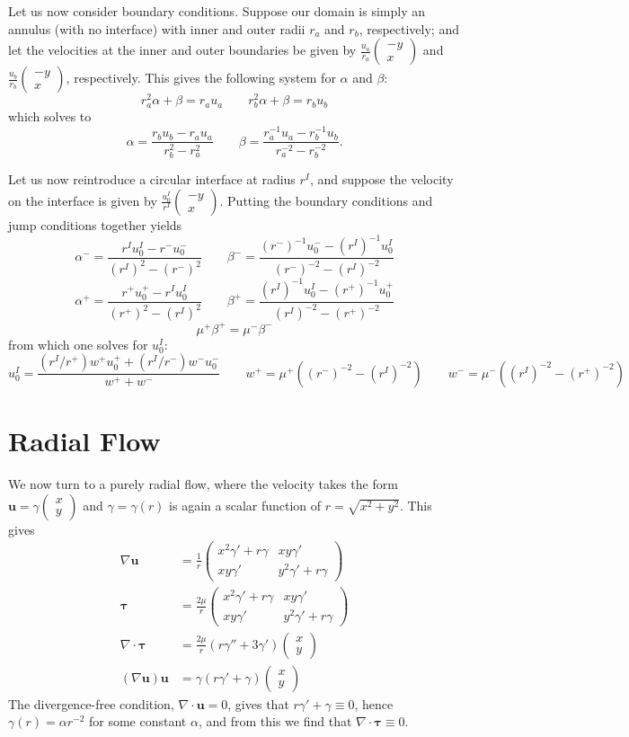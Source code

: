 \documentclass{article}
\newcommand{\q}{\quad\quad}
\newcommand{\uu}{\mathbf{u}}
\renewcommand{\uu}{\mathbf{u}}
\newcommand{\ta}{\pmb{\tau}}
\newcommand{\mx}[1]{\begin{pmatrix} #1 \end{pmatrix}}
\begin{document}
Let us now consider boundary conditions.  Suppose our domain is simply an annulus (with no interface) with inner and outer radii $r_a$ and $r_b$, respectively; and let the velocities at the inner and outer boundaries be given by $\frac{u_a}{r_a} \mx{-y \\ x}$ and $\frac{u_b}{r_b} \mx{-y \\ x}$, respectively.  This gives the following system for $\alpha$ and $\beta$:
$$ r_a^2 \alpha + \beta = r_a u_a \q r_b^2 \alpha + \beta = r_b u_b $$
which solves to
$$ \alpha = \frac{r_b u_b - r_a u_a}{r_b^2 - r_a^2} \q \beta = \frac{r_a^{-1} u_a - r_b^{-1} u_b}{r_a^{-2} - r_b^{-2}}. $$

Let us now reintroduce a circular interface at radius $r^I$, and suppose the velocity on the interface is given by $\frac{u^I_0}{r^I} \mx{-y \\ x}$.  Putting the boundary conditions and jump conditions together yields
$$ \alpha^- = \frac{r^I u^I_0 - r^- u^-_0}{(r^I)^2 - (r^-)^2} \q \beta^- = \frac{(r^-)^{-1} u^-_0 - (r^I)^{-1} u^I_0}{(r^-)^{-2} - (r^I)^{-2}} $$
$$ \alpha^+ = \frac{r^+ u^+_0 - r^I u^I_0}{(r^+)^2 - (r^I)^2} \q \beta^+ = \frac{(r^I)^{-1} u^I_0 - (r^+)^{-1} u^+_0}{(r^I)^{-2} - (r^+)^{-2}} $$
$$ \mu^+ \beta^+ = \mu^- \beta^- $$
from which one solves for $u^I_0$:
$$ u^I_0 = \frac{(r^I/r^+) w^+ u^+_0 + (r^I/r^-) w^- u^-_0}{w^+ + w^-} \q w^+ = \mu^+ \left( (r^-)^{-2} - (r^I)^{-2} \right) \q w^- = \mu^- \left( (r^I)^{-2} - (r^+)^{-2} \right) $$

\section{Radial Flow}

We now turn to a purely radial flow, where the velocity takes the form $\uu = \gamma \mx{x \\ y}$ and $\gamma = \gamma(r)$ is again a scalar function of $r = \sqrt{x^2 + y^2}$.  This gives
\begin{align}
\nabla \uu & = \frac{1}{r} \mx{x^2 \gamma' + r \gamma & xy \gamma' \\ xy \gamma' & y^2 \gamma' + r \gamma} \\
\ta & = \frac{2\mu}{r} \mx{x^2 \gamma' + r \gamma & xy \gamma' \\ xy \gamma' & y^2 \gamma' + r \gamma} \\
\nabla \cdot \ta & = \frac{2\mu}{r} \left( r \gamma'' + 3 \gamma' \right) \mx{x \\ y} \\
\left( \nabla \uu \right) \uu & = \gamma \left( r \gamma' + \gamma \right) \mx{x \\ y}
\end{align}
The divergence-free condition, $\nabla \cdot \uu = 0$, gives that $r \gamma' + \gamma \equiv 0$, hence $\gamma(r) = \alpha r^{-2}$ for some constant $\alpha$, and from this we find that $\nabla \cdot \ta \equiv 0$.
\end{document}

